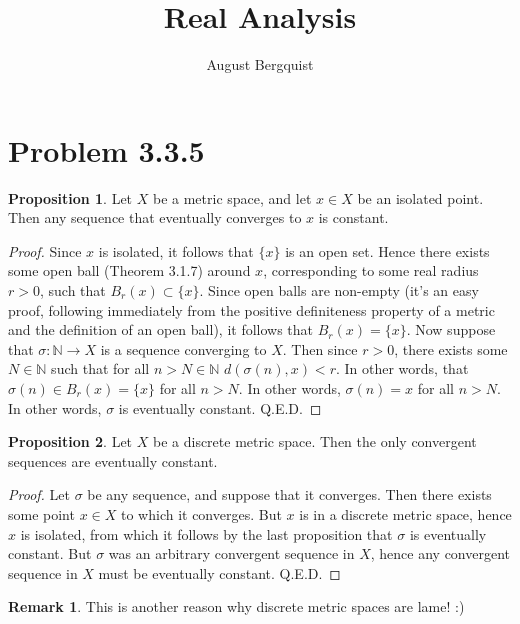 \documentclass[11pt]{article}
\title{Real Analysis}
\author{August Bergquist}
\newcommand{\N}{\mathbb{N}}
\theoremstyle{definition}
\newtheorem{proposition}{Proposition}
\newtheorem{remark}{Remark}
\begin{document}
\maketitle


\section{Problem 3.3.5}

\begin{proposition}
Let $X$ be a metric space, and let $x\in X$ be an isolated point. Then any sequence that eventually converges to $x$ is constant. 
\end{proposition}


\begin{proof}
Since $x$ is isolated, it follows that $\{x\}$ is an open set. Hence there exists some open ball (Theorem 3.1.7) around $x$, corresponding to some real radius $r>0$, such that $ B_r(x) \subset \{x\} $. Since open balls are non-empty (it's an easy proof, following immediately from the positive definiteness property of a metric and the definition of an open ball), it follows that $B_r(x) = \{x\}$. Now suppose that $\sigma:\N\to X$ is a sequence converging to $X$. Then since $r>0$, there exists some $N\in \N$ such that for all $n>N\in \N$ $d(\sigma(n), x) < r$. In other words, that $\sigma(n) \in B_r(x) = \{x\}$ for all $n> N$. In other words, $\sigma(n) = x$ for all $n> N$. In other words, $\sigma$ is eventually constant. Q.E.D.
\end{proof}

\begin{proposition}
Let $X$ be a discrete metric space. Then the only convergent sequences are eventually constant. 
\end{proposition}

\begin{proof}
Let $\sigma$ be any sequence, and suppose that it converges. Then there exists some point $x\in X$ to which it converges. But $x$ is in a discrete metric space, hence $x$ is isolated, from which it follows by the last proposition that $\sigma$ is eventually constant. But $\sigma$ was an arbitrary convergent sequence in $X$, hence any convergent sequence in $X$ must be eventually constant. Q.E.D.
\end{proof}

\begin{remark}
This is another reason why discrete metric spaces are lame! :)
\end{remark}
\end{document}
